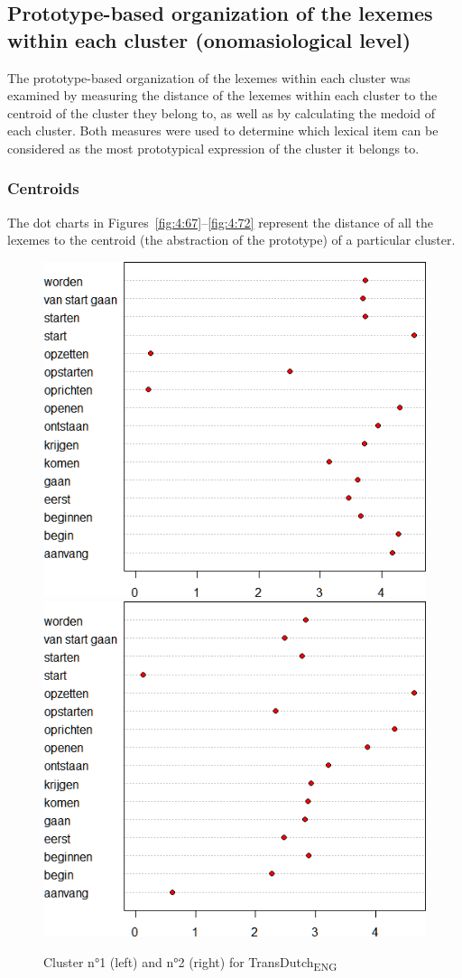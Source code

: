 \subsection{Prototype-based organization of the lexemes within each cluster (onomasiological level)}
\label{sec:4.3.3}  
The prototype-based organization of the lexemes within each cluster was examined by measuring the distance of the lexemes within each cluster to the centroid of the cluster they belong to, as well as by calculating the medoid of each cluster. Both measures were used to determine which lexical item can be considered as the most prototypical expression of the cluster it belongs to.

\subsubsection{Centroids}
\label{sec:4.3.3.1}  
The dot charts in Figures~\ref{fig:4:67}--\ref{fig:4:72} represent the distance of all the lexemes to the centroid (the abstraction of the prototype) of a particular cluster.

\begin{figure}
\includegraphics[width=.48\textwidth,trim=0 10 0 10]{figures/Vandevoorde2-img69.png}\hfill%
\includegraphics[width=.48\textwidth,trim=0 10 0 10]{figures/Vandevoorde2-img70.png}
\caption{\label{fig:4:67}Cluster n°1 (left) and n°2 (right) for TransDutch\textsubscript{ENG}\label{fig:4:68}}
\end{figure}

